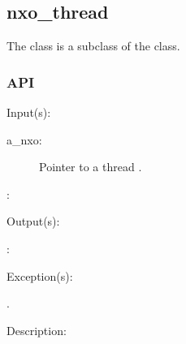 %
%
%
%
%              

\subsection{nxo\_thread}
\label{nxo_thread}

The  class is a subclass of the  class.

\subsubsection{API}
\begin{capi}
\label{nxo_thread_}
	\begin{capilist}
	\item[Input(s): ]
		\begin{description}\item[]
		\item[a\_nxo: ]
			Pointer to a thread .
		\item[: ]
		\end{description}
	\item[Output(s): ]
		\begin{description}\item[]
		\item[: ]
		\end{description}
	\item[Exception(s): ]
		\begin{description}\item[]
		\item[.]
		\end{description}
	\item[Description: ]
	\end{capilist}
\end{capi}
